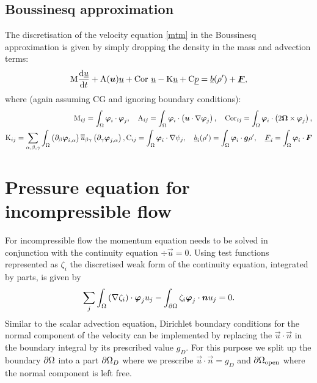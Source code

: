 \subsection{Boussinesq approximation}

The discretisation of the velocity equation \eqref{mtm}
in the Boussinesq approximation is given by simply
dropping the density in the mass and advection terms:
\begin{equation*}
  \mathrm{M} \frac{\mathrm{d}\underline{u}}{\mathrm{d} t}
    +\mathrm{A}({\mbox{\boldmath$u$}})\underline{u}
    +\mathrm{Cor}~\underline{u}
    -\mathrm{K}\underline{u}
    +\mathrm{C} \underline{p}
    =\underline{b}(\rho')+\underline{{\mbox{\boldmath$F$}}},
\end{equation*}
where (again assuming CG and ignoring boundary conditions):
\begin{equation*}
\begin{split}
  \mathrm{M}_{ij}=\int_\Omega {\mbox{\boldmath$\varphi$}}_i\cdot{\mbox{\boldmath$\varphi$}}_j, \quad
  \mathrm{A}_{ij}=\int_\Omega {\mbox{\boldmath$\varphi$}}_i\cdot\left({\mbox{\boldmath$u$}}\cdot\nabla {\mbox{\boldmath$\varphi$}}_j\right), \quad
  \mathrm{Cor}_{ij}=
    \int_\Omega {\mbox{\boldmath$\varphi$}}_i\cdot\left(2{\mbox{\boldmath$\Omega$}}\times{\mbox{\boldmath$\varphi$}}_j\right), \\
  \mathrm{K}_{ij}=\sum_{\alpha,\beta,\gamma} \int_\Omega
    \left(\partial_\beta{\mbox{\boldmath$\varphi$}}_{i,\alpha}\right) \overline{\overline{u}}_{\beta\gamma}
      \left(\partial_\gamma {\mbox{\boldmath$\varphi$}}_{j,\alpha}\right),
  \mathrm{C}_{ij}=\int_\Omega {\mbox{\boldmath$\varphi$}}_i\cdot\nabla\psi_j, \quad
    \underline{b}_i(\rho')=\int_\Omega {\mbox{\boldmath$\varphi$}}_i\cdot{\mbox{\boldmath$g$}}\rho',\quad
    \underline{F}_i=\int_\Omega {\mbox{\boldmath$\varphi$}}_i \cdot{\mbox{\boldmath$F$}}
\end{split}
\end{equation*}

\section{Pressure equation for incompressible flow}
\label{sec:ND_pressure_equation}

For incompressible flow the momentum equation needs to be solved
in conjunction with the continuity equation
$\div\vec u=0$. Using test functions represented as $\zeta_{i}$ the discretised 
weak form of the continuity equation, integrated by parts, is given by
\begin{equation*}
  \sum_j \int_\Omega \left(\nabla\zeta_i\right)\cdot{\mbox{\boldmath$\varphi$}}_j u_j -
    \int_{\partial\Omega} \zeta_i{\mbox{\boldmath$\varphi$}}_j\cdot{\mbox{\boldmath$n$}} u_j = 0.
  \label{continuity_byparts}
\end{equation*}
Similar to the scalar advection equation, Dirichlet boundary conditions for the
normal component of the velocity can be implemented by replacing
the $\vec u\cdot\vec n$ in the boundary integral by its prescribed
value $g_D$. For this purpose we split up the
boundary ${\partial\Omega}$ into a part
${\partial\Omega}_D$ where we prescribe $\vec u\cdot\vec n=g_D$ and
${\partial\Omega}_{\mathrm{open}}$ where the normal component is left free.

